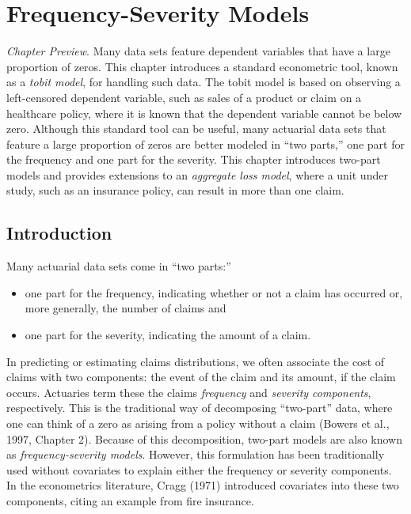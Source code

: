 \setcounter{chapter}{15}

\chapter{Frequency-Severity Models}

{\small \textit{Chapter Preview}. Many data sets feature dependent
variables that have a large proportion of zeros. This chapter
introduces a standard econometric tool, known as a \emph{tobit
model}, for handling such data. The tobit model is based on
observing a left-censored dependent variable, such as sales of a
product or claim on a healthcare policy, where it is known that the
dependent variable cannot be below zero. Although this standard tool
can be useful, many actuarial data sets that feature a large
proportion of zeros are better modeled in ``two parts,'' one part
for the frequency and one part for the severity. This chapter
introduces two-part models and provides extensions to an
\emph{aggregate loss model}, where a unit under study, such as an
insurance policy, can result in more than one claim.}


\section{Introduction}

Many actuarial data sets come in ``two parts:''

\begin{itemize}
\item one part for the frequency, indicating whether or not a claim has
occurred or, more generally, the number of claims and

\item one part for the severity, indicating the amount of a claim.
\end{itemize}


In predicting or estimating claims distributions, we often associate
the cost of claims with two components: the event of the claim and
its amount, if the claim occurs. Actuaries term these the claims
\emph{frequency} and \emph{severity components}, respectively. This
is the traditional way of decomposing ``two-part'' data, where one
can think of a zero as arising from a policy without a claim (Bowers
et al., 1997, Chapter 2). Because of this decomposition, two-part
models are also known as \emph{frequency-severity models}. However,
this formulation has been traditionally used without covariates to
explain either the frequency or severity components. In the
econometrics literature, Cragg (1971) introduced covariates into
these two components, citing an example from fire insurance.

